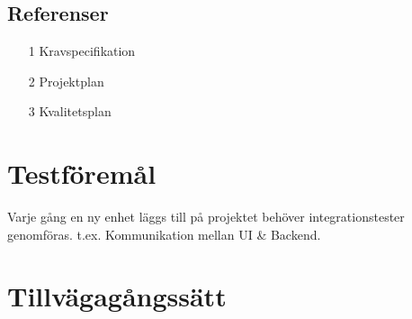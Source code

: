 \documentclass[10pt]{article}
\begin{document}
	\subsection{Referenser}
		\begin{itemize}
		\item [1] Kravspecifikation
		\item [2] Projektplan
		\item [3] Kvalitetsplan
		\end{itemize}

	
\section{Testföremål}
	Varje gång en ny enhet läggs till på projektet behöver integrationstester genomföras. t.ex. Kommunikation mellan UI & Backend.
	
	
	
	



\section{Tillvägagångssätt}
\end{document}
